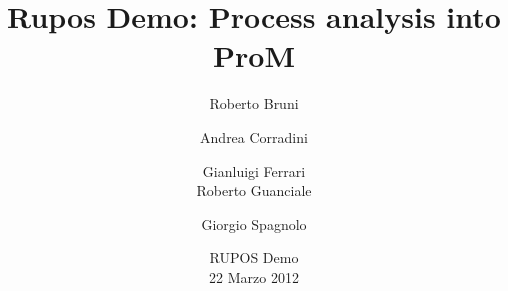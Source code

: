 \documentclass[10pt]{beamer}
\title{Rupos Demo: Process analysis into ProM}
\author[Bruni, Corradini, Ferrari, Guanciale, \alert{Spagnolo}]{Roberto Bruni \and Andrea Corradini  \and Gianluigi Ferrari\\ 
	Roberto Guanciale  \and \alert{Giorgio Spagnolo}}
\institute{Dipartimento di Informatica, Pisa}
\date{RUPOS Demo \\ 22 Marzo 2012}
\begin{document}
	\frame{\titlepage}
	
	
	
	
	
	
	
\end{document}
